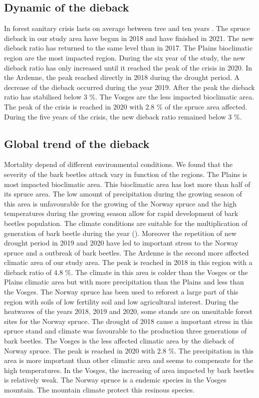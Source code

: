 \documentclass[3p,procedia]{elsarticle}
\begin{document}
\subsection{Dynamic of the dieback}
In forest sanitary crisis lasts on average between tree and ten years \citep{gauquelin_guide_2010}.
The spruce dieback in our study area have begun in 2018 and have finished in 2021.
The new dieback ratio has returned to the same level than in 2017.
The Plains bioclimatic region are the most impacted region.
During the six year of the study, the new dieback ratio has only increased until it reached the peak of the crisis in 2020.
In the Ardenne, the peak reached directly in 2018 during the drought period.
A decrease of the dieback occurred during the year 2019.
After the peak the dieback ratio has stabilised below 3 \%.
The Vosges are the less impacted bioclimatic area. 
The peak of the crisis is reached in 2020 with 2.8 \% of the spruce area affected.
During the five years of the crisis, the new dieback ratio remained below 3 \%.


\subsection{Global trend of the dieback}

Mortality depend of different environmental conditions.
We found that the severity of the bark beetles attack vary in function of the regions. 
The Plains is most impacted bioclimatic area.
This bioclimatic area has lost more than half of its spruce area.
The low amount of precipitation during the growing season of this area is unfavourable for the growing of the Norway spruce and the high temperatures during the growing season allow for rapid development of bark beetles population.
The climate conditions are suitable for the multiplication of generation of bark beetle during the year (\citep{annila_influence_1969,baier_phenipscomprehensive_2007}).
Moreover the repetition of new drought period in 2019 and 2020 have led to important stress to the Norway spruce and a outbreak of bark beetles. 
The Ardenne is the second more affected climatic area of our study area.
The peak is reached in 2018 in this region with a dieback ratio of 4.8 \%.  
The climate in this area is colder than the Vosges or the Plains climatic area but with more precipitation than the Plains and less than the Vosges.
The Norway spruce has been used to reforest a large part of this region with soils of low fertility soil and low agricultural interest. 
During the heatwaves of the years 2018, 2019 and 2020, some stands are on unsuitable forest sites for the Norway spruce. 
The drought of 2018 cause a important stress in this spruce stand and climate was favourable to the production three generations of bark beetles.
The Vosges is the less affected climatic area by the dieback of Norway spruce.
The peak is reached in 2020 with 2.8 \%.
The precipitation in this area is more important than other climatic area and seems to compensate for the high temperatures.
In the Vosges, the increasing of area impacted by bark beetles is relatively weak.
The Norway spruce is a endemic species in the Vosges mountain. 
The mountain climate protect this resinous species. 
\end{document}
